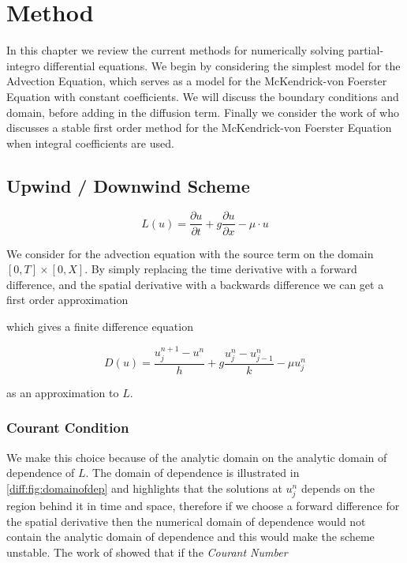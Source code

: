 \documentclass[../main]{subfiles}
\begin{document}
  \chapter{Method}\label{chapter:method}

  In this chapter we review the current methods for numerically solving partial-integro differential equations. We begin by considering the simplest model for the Advection Equation, which serves as a model for the McKendrick-von Foerster Equation with constant coefficients. We will discuss the boundary conditions and domain, before adding in the diffusion term. Finally we consider the work of \cite{hartvig2011} who discusses a stable first order method for the McKendrick-von Foerster Equation when integral coefficients are used.

  \section{Upwind / Downwind Scheme}
  \begin{equation}
    L(u) = \frac{\partial u}{\partial t} + g \frac{\partial u}{\partial x} - \mu \cdot u
  \end{equation}

  We consider for the advection equation with the source term on the domain $[0, T] \times [0, X]$. By simply replacing the time derivative with a forward difference, and the spatial derivative with a backwards difference we can get a first order approximation

  which gives a finite difference equation

  \begin{equation}
    D(u) = \frac{u^{n+1}_j - u^n}{h} + g \frac{u^n_{j} - u^n_{j-1}}{k} - \mu u^n_j
  \end{equation}

  as an approximation to $L$.

  \subsection{Courant Condition}
  We make this choice because of the analytic domain on the analytic domain of dependence of $L$. The domain of dependence is illustrated in \autoref{diff:fig:domainofdep} and highlights that the solutions at $u^n_j$ depends on the region behind it in time and space, therefore if we choose a forward difference for the spatial derivative then the numerical domain of dependence would not contain the analytic domain of dependence and this would make the scheme unstable. The work of \cite{courant1928} showed that if the \emph{Courant Number}
\end{document}
